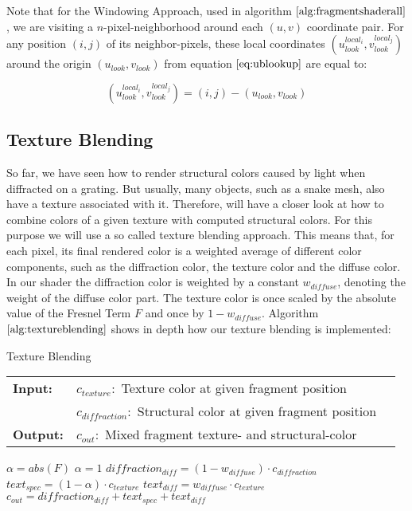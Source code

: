 Note that for the Windowing Approach, used in algorithm $\ref{alg:fragmentshaderall}$, we are visiting a $n$-pixel-neighborhood around each $(u,v)$ coordinate pair. For any position $(i,j)$ of its neighbor-pixels, these local coordinates $(u_{look}^{local_i}, v_{look}^{local_j})$ around the origin $(u_{look}, v_{look})$ from equation $\ref{eq:ublookup}$ are equal to:

\begin{equation}
  (u_{look}^{local_i}, v_{look}^{local_j}) = (i,j)-(u_{look}, v_{look})
\label{eq:gaussianwindowlook}
\end{equation}

\subsection{Texture Blending}
So far, we have seen how to render structural colors caused by light when diffracted on a grating. But usually, many objects, such as a snake mesh, also have a texture associated with it. Therefore, will have a closer look at how to combine colors of a given texture with computed structural colors. For this purpose we will use a so called texture blending approach. This means that, for each pixel, its final rendered color is a weighted average of different color components, such as the diffraction color, the texture color and the diffuse color. In our shader the diffraction color is weighted by a constant $w_{diffuse}$, denoting the weight of the diffuse color part. The texture color is once scaled by the absolute value of the Fresnel Term $F$ and once by $1-w_{diffuse}$. Algorithm $\ref{alg:textureblending}$ shows in depth how our texture blending is implemented:

\begin{algorithm}[H]
\caption{Texture Blending}
\begin{table}[H]
  \begin{tabular}{@{}lll@{}}
    \textbf{Input:} & $c_{texture}:$ Texture color at given fragment position \\
    & $c_{diffraction}:$ Structural color at given fragment position \\
    \textbf{Output:} & $c_{out}:$ Mixed fragment texture- and structural-color \\
  \end{tabular} 
\end{table}
\setlength{\fboxrule}{0pt} 
\begin{boxedminipage}{1.0\textwidth}
  \begin{algorithmic}[1]
    \State $\alpha = abs(F)$
     \State $\alpha = 1$ \EndIf
    \State $diffraction_{diff} = (1-w_{diffuse}) \cdot c_{diffraction}$
    \State $text_{spec} = (1-\alpha) \cdot c_{texture}$
    \State $text_{diff} = w_{diffuse} \cdot c_{texture}$
    \State $c_{out} = diffraction_{diff} + text_{spec} + text_{diff}$
  \end{algorithmic}
  \end{boxedminipage}
  \vskip1.5pt
\label{alg:textureblending}
\end{algorithm}

